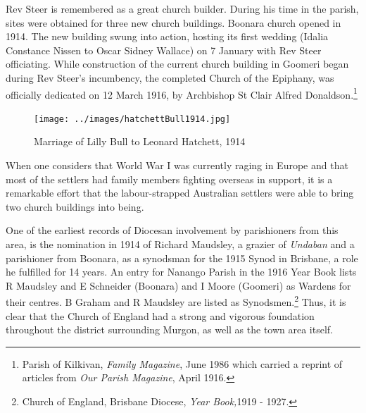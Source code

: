Rev Steer is remembered as a great church builder. During his time in the parish, sites were obtained for three new church buildings. Boonara church opened in 1914. The new building swung into action, hosting its first wedding (Idalia Constance Nissen to Oscar Sidney Wallace) on 7 January with Rev Steer officiating. While construction of the current church building in Goomeri began during Rev Steer's incumbency, the completed Church of the Epiphany, was officially dedicated on 12 March 1916, by Archbishop St Clair Alfred Donaldson.\footnote{Parish of Kilkivan, \emph{Family Magazine}, June 1986 which carried a reprint of articles from \emph{Our Parish Magazine}, April 1916.}








\begin{figure}[!htb]
\begin{center}
\texttt{[image: ../images/hatchettBull1914.jpg]}
\caption{Marriage of Lilly Bull to Leonard Hatchett, 1914}
\end{center}
\end{figure}




When one considers that World War I was currently raging in Europe and that most of the settlers had family members fighting overseas in support, it is a remarkable effort that the labour-strapped Australian settlers were able to bring two church buildings into being.



One of the earliest records of Diocesan involvement by parishioners from this area, is the nomination in 1914 of Richard Maudsley, a grazier of \emph{Undaban} and a parishioner from Boonara, as a synodsman for the 1915 Synod in Brisbane, a role he fulfilled for 14 years. An entry for Nanango Parish in the 1916 Year Book lists R Maudsley and E Schneider (Boonara) and I Moore (Goomeri) as Wardens for their centres. B Graham and R Maudsley are listed as Synodsmen.\footnote{Church of England, Brisbane Diocese, \emph{Year Book,}1919 - 1927.} Thus, it is clear that the Church of England had a strong and vigorous foundation throughout the district surrounding Murgon, as well as the town area itself.









